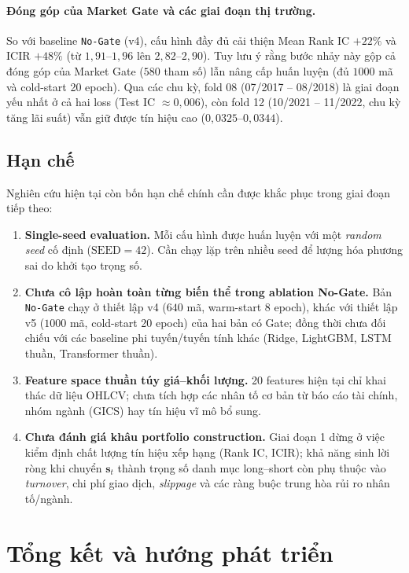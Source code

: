 \documentclass[a4paper,12pt]{article}
\begin{document}
\paragraph{Đóng góp của Market Gate và các giai đoạn thị trường.} So với baseline \texttt{No-Gate} (v4), cấu hình đầy đủ cải thiện Mean Rank IC $+22\%$ và ICIR $+48\%$ (từ $1{,}91$--$1{,}96$ lên $2{,}82$--$2{,}90$). Tuy lưu ý rằng bước nhảy này gộp cả đóng góp của Market Gate ($580$ tham số) lẫn nâng cấp huấn luyện (đủ $1000$ mã và cold-start 20 epoch). Qua các chu kỳ, fold 08 (07/2017 -- 08/2018) là giai đoạn yếu nhất ở cả hai loss (Test IC $\approx 0{,}006$), còn fold 12 (10/2021 -- 11/2022, chu kỳ tăng lãi suất) vẫn giữ được tín hiệu cao ($0{,}0325$--$0{,}0344$).

\subsection{Hạn chế}
Nghiên cứu hiện tại còn bốn hạn chế chính cần được khắc phục trong giai đoạn tiếp theo:
\begin{enumerate}
    \item \textbf{Single-seed evaluation.} Mỗi cấu hình được huấn luyện với một \textit{random seed} cố định ($\mathrm{SEED}=42$). Cần chạy lặp trên nhiều seed để lượng hóa phương sai do khởi tạo trọng số.
    \item \textbf{Chưa cô lập hoàn toàn từng biến thể trong ablation No-Gate.} Bản \texttt{No-Gate} chạy ở thiết lập v4 ($640$ mã, warm-start 8 epoch), khác với thiết lập v5 ($1000$ mã, cold-start 20 epoch) của hai bản có Gate; đồng thời chưa đối chiếu với các baseline phi tuyến/tuyến tính khác (Ridge, LightGBM, LSTM thuần, Transformer thuần).
    \item \textbf{Feature space thuần túy giá--khối lượng.} 20 features hiện tại chỉ khai thác dữ liệu OHLCV; chưa tích hợp các nhân tố cơ bản từ báo cáo tài chính, nhóm ngành (GICS) hay tín hiệu vĩ mô bổ sung.
    \item \textbf{Chưa đánh giá khâu portfolio construction.} Giai đoạn 1 dừng ở việc kiểm định chất lượng tín hiệu xếp hạng (Rank IC, ICIR); khả năng sinh lời ròng khi chuyển $\mathbf{s}_t$ thành trọng số danh mục long--short còn phụ thuộc vào \textit{turnover}, chi phí giao dịch, \textit{slippage} và các ràng buộc trung hòa rủi ro nhân tố/ngành.
\end{enumerate}

\newpage
\section{Tổng kết và hướng phát triển}\label{sec:summary}
\end{document}
